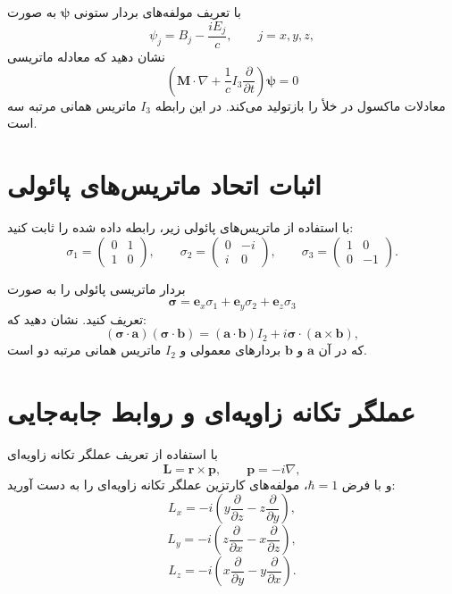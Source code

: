 \documentclass[a4paper,16pt]{article}
\begin{document}
	با تعریف مولفه‌های بردار ستونی \(\boldsymbol{\psi}\) به صورت
	\[
	\psi_j=B_j-\frac{iE_j}{c},
	\qquad j=x,y,z,
	\]
	نشان دهید که معادله ماتریسی
	\[
	\left(
	\mathbf{M}\cdot\nabla
	+
	\frac{1}{c}I_3\frac{\partial}{\partial t}
	\right)
	\boldsymbol{\psi}=0
	\]
	معادلات ماکسول در خلأ را بازتولید می‌کند.
	در این رابطه \(I_3\) ماتریس همانی مرتبه سه است.
	
	\medskip
	
	
	\section{اثبات اتحاد ماتریس‌های پائولی}
	
	با استفاده از ماتریس‌های پائولی زیر، رابطه داده شده را ثابت کنید:
	\[
	\sigma_1=
	\begin{pmatrix}
		0&1\\
		1&0
	\end{pmatrix},
	\qquad
	\sigma_2=
	\begin{pmatrix}
		0&-i\\
		i&0
	\end{pmatrix},
	\qquad
	\sigma_3=
	\begin{pmatrix}
		1&0\\
		0&-1
	\end{pmatrix}.
	\]
	
	بردار ماتریسی پائولی را به صورت
	\[
	\boldsymbol{\sigma}
	=
	\mathbf{e}_x\sigma_1
	+
	\mathbf{e}_y\sigma_2
	+
	\mathbf{e}_z\sigma_3
	\]
	تعریف کنید. نشان دهید که:
	\[
	(\boldsymbol{\sigma}\cdot\mathbf{a})
	(\boldsymbol{\sigma}\cdot\mathbf{b})
	=
	(\mathbf{a}\cdot\mathbf{b})I_2
	+
	i\boldsymbol{\sigma}\cdot
	(\mathbf{a}\times\mathbf{b}),
	\]
	که در آن \(\mathbf{a}\) و \(\mathbf{b}\) بردارهای معمولی و
	\(I_2\) ماتریس همانی مرتبه دو است.
	
	\newpage
	
	
	\section{عملگر تکانه زاویه‌ای و روابط جابه‌جایی}
	
	با استفاده از تعریف عملگر تکانه زاویه‌ای
	\[
	\mathbf{L}=\mathbf{r}\times\mathbf{p},
	\qquad
	\mathbf{p}=-i\nabla,
	\]
	و با فرض \(\hbar=1\)، مولفه‌های کارتزین عملگر تکانه زاویه‌ای
	را به دست آورید:
	\[
	L_x=-i\left(
	y\frac{\partial}{\partial z}
	-z\frac{\partial}{\partial y}
	\right),
	\]
	\[
	L_y=-i\left(
	z\frac{\partial}{\partial x}
	-x\frac{\partial}{\partial z}
	\right),
	\]
	\[
	L_z=-i\left(
	x\frac{\partial}{\partial y}
	-y\frac{\partial}{\partial x}
	\right).
	\]
	
\end{document}
